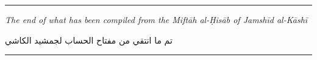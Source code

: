\documentclass[11pt,a4paper]{article}
\newcommand{\shortline}{\noindent\rule{0.5\textwidth}{0.4pt}\par}
\newcommand{\ar}[1]{\arabicfont\beginR #1\endR}
\begin{document}
\vspace{0.5cm}

\begin{center}
\shortline

\vspace{0.5cm}

\textit{The end of what has been compiled from the \textit{Mift\=ah
al-\d{H}is\=ab} of Jamsh\=id al-K\=ash\=i}

\vspace{0.3cm}

\ar{تم ما انتقي من مفتاح الحساب لجمشيد الكاشي}

\vspace{0.5cm}

\shortline
\end{center}
\end{document}
